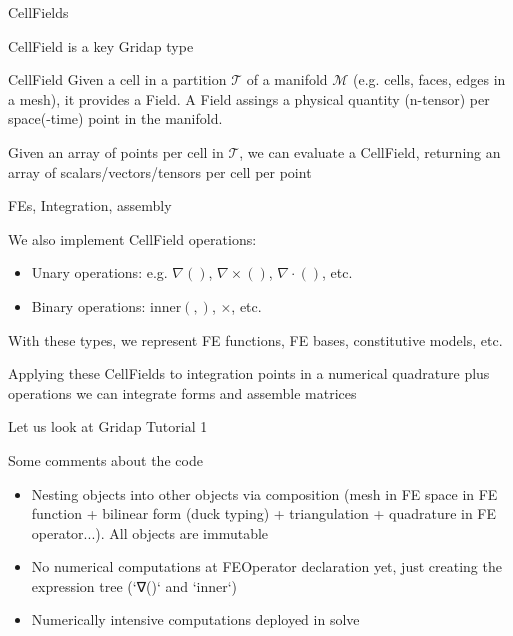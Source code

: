 \begin{frame}{CellFields}

CellField is a key Gridap type

\begin{block}{CellField}
  Given a cell in a partition $\mathcal{T}$ of a manifold $\mathcal{M}$ (e.g. cells, faces, edges in a mesh), it provides a Field. A Field assings a physical quantity (n-tensor) per space(-time) point in the manifold.

  Given an array of points per cell in $\mathcal{T}$, we can evaluate a CellField, returning an array of scalars/vectors/tensors per cell per point
\end{block}

\end{frame}

\begin{frame}{FEs, Integration, assembly}


We also implement CellField operations:

\begin{itemize}
\item Unary operations: e.g. $\nabla()$, $\nabla\times()$, $\nabla \cdot()$, etc.
\item Binary operations: inner$(,)$, $\times$, etc.
\end{itemize}

With these types, we represent FE functions, FE bases, constitutive models, etc.

Applying these CellFields to integration points in a numerical quadrature plus operations we can integrate forms and assemble matrices

Let us look at Gridap Tutorial 1
\end{frame}

\begin{frame}{Some comments about the code}

\begin{itemize}

\item Nesting objects into other objects via composition (mesh in FE space in FE function + bilinear form (duck typing) + triangulation + quadrature in FE operator...). All objects are immutable

\item No numerical computations at FEOperator declaration yet, just creating the expression tree (`∇()` and `inner`)

\item Numerically intensive computations deployed in solve

\end{itemize}

\end{frame}

